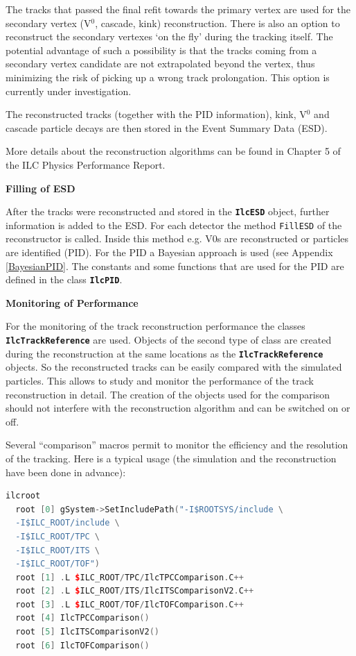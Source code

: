 \documentclass[12pt,a4paper,twoside]{article}
\newcommand{\class}[1]{\texttt{\textbf{#1}}\xspace}
\newcommand{\method}[1]{\texttt{#1}\xspace}
\begin{document}
The tracks that passed the final refit towards the primary vertex are used
for the secondary vertex (V$^0$, cascade, kink) reconstruction.  There is also
an option to reconstruct the secondary vertexes `on the fly' during the
tracking itself. The potential advantage of such a possibility is that
the tracks coming from a secondary vertex candidate are not extrapolated
beyond the vertex, thus minimizing the risk of picking up a wrong track
prolongation.  This option is currently under investigation.

The reconstructed tracks (together with the PID information), kink, V$^0$  
and cascade particle decays are then stored in the Event Summary Data (ESD). 

More details about the reconstruction algorithms can be found in
Chapter 5 of the ILC Physics Performance Report\cite{PPRVII}.

\noindent
\textbf{Filling of ESD}

After the tracks were reconstructed and stored in the \class{IlcESD} object,
further information is added to the ESD. For each detector the method
\method{FillESD} of the reconstructor is called. Inside this method e.g. V0s
are reconstructed or particles are identified (PID). For the PID a
Bayesian approach is used (see Appendix \ref{BayesianPID}. The constants
and some functions that are used for the PID are defined in the class
\class{IlcPID}.


\textbf{Monitoring of Performance}

For the monitoring of the track reconstruction performance the classes
\class{IlcTrackReference} are used. 
Objects of the second type of class are created during the
reconstruction at the same locations as the \class{IlcTrackReference}
objects. 
So the reconstructed tracks can be easily compared with the simulated
particles. 
This allows to study and monitor the performance of the track reconstruction in detail.
The creation of the objects used for the comparison should not
interfere with the reconstruction algorithm and can be switched on or
off. 

Several ``comparison'' macros permit to monitor the efficiency and the
resolution of the tracking. Here is a typical usage (the simulation
and the reconstruction have been done in advance):

\begin{lstlisting}[language=C++]
  ilcroot
  root [0] gSystem->SetIncludePath("-I$ROOTSYS/include \
  -I$ILC_ROOT/include \
  -I$ILC_ROOT/TPC \
  -I$ILC_ROOT/ITS \
  -I$ILC_ROOT/TOF")
  root [1] .L $ILC_ROOT/TPC/IlcTPCComparison.C++
  root [2] .L $ILC_ROOT/ITS/IlcITSComparisonV2.C++
  root [3] .L $ILC_ROOT/TOF/IlcTOFComparison.C++
  root [4] IlcTPCComparison()
  root [5] IlcITSComparisonV2()
  root [6] IlcTOFComparison()
\end{lstlisting}
\end{document}
